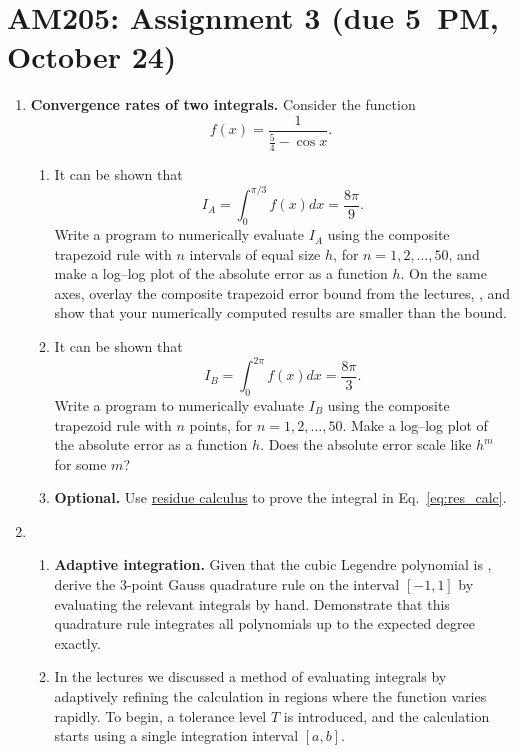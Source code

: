 \documentclass[11pt]{article}
\begin{document}
\section*{AM205: Assignment 3 (due 5~PM, October 24)}
\begin{enumerate}
  \item {\bf Convergence rates of two integrals.} Consider the function
    \begin{equation}
      f(x)=\frac{1}{\tfrac{5}{4} - \cos x}.
    \end{equation}
    \begin{enumerate}
      \item It can be shown that
	\begin{equation}
	  I_A = \int_0^{\pi/3}f(x)dx = \frac{8\pi}{9}.
	\end{equation}
	Write a program to numerically evaluate $I_A$ using the composite
	trapezoid rule with $n$ intervals of equal size $h$, for
	$n=1,2,\ldots,50$, and make a log--log plot of the absolute error as a
	function $h$. On the same axes, overlay the composite trapezoid error
	bound from the lectures,
	, and show that your
	numerically computed results are smaller than the bound.
      \item It can be shown that
	\begin{equation}
	  I_B = \int_0^{2\pi}f(x)dx = \frac{8\pi}{3}.\label{eq:res_calc}
	\end{equation}
	Write a program to numerically evaluate $I_B$ using the composite
	trapezoid rule with $n$ points, for $n=1,2,\ldots,50$. Make a log--log
	plot of the absolute error as a function $h$. Does the absolute error
	scale like $h^m$ for some $m$?
      \item \textbf{Optional.} Use
	\href{http://en.wikipedia.org/wiki/Residue_theorem}{residue calculus}
	to prove the integral in Eq.~\ref{eq:res_calc}.
    \end{enumerate}
  \item
    \begin{enumerate}
      \item \textbf{Adaptive integration.} Given that the cubic Legendre
	polynomial is , derive the
	3-point Gauss quadrature rule on the interval $[-1,1]$ by evaluating
	the relevant integrals by hand. Demonstrate that this quadrature rule
	integrates all polynomials up to the expected degree exactly.
      \item In the lectures we discussed a method of evaluating integrals
	 by adaptively refining the calculation in
	regions where the function varies rapidly. To begin, a tolerance level
	$T$ is introduced, and the calculation starts using a single
	integration interval $[a,b]$.
	

\end{enumerate}
\end{enumerate}
\end{document}
